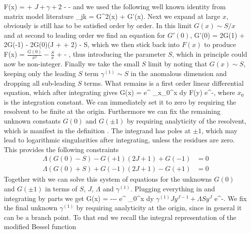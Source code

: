 \beq
	F(x) =  + \( J + \gamma + 2 \) -  - 
\eeq
and we used the following well known identity from matrix model literature
\beq
	\sum_{j\neq k}  = G^2(x) + G'(x).
\eeq
Next we expand  at large $x$, obviously is still has to be satisfied order by order.
In this limit $G(x) \sim S/x$ and at second to leading order we find an equation for $G'(0)$,
\beq
	\Lambda G'(0) = 2G(1) + 2G(-1) - 2G(0)(J + \gamma + 2) - \Lambda S,
\eeq
which we then stick back into $F(x)$ to produce
\beq
	F(x) = \( \frac{G(0)}{x^2} - \frac{S}{x} \) +  - ,
\eeq
thus introducing the parameter $S$, which in principle could now be non-integer.
Finally we take the small $S$ limit by noting that $G(x) \sim S$, keeping only the leading $S$ term $\gamma^{(1)} \sim S$ in the anomalous dimension and dropping all sub-leading $S$ terms. 
What remains is a first order linear differential equation, which after integrating gives
\beq
	G(x) =  e^{\Lambda {}} \int_{x_0}^x dy \; F(y)  e^{-\Lambda {}},
\eeq
where $x_0$ is the integration constant.
We can immediately set it to zero by requiring the resolvent to be finite at the origin.
Furthermore we can fix the remaining unknown constants $G(0)$ and $G(\pm 1)$ by requiring analyticity of the resolvent, which is manifest in the definition .
The integrand has poles at $\pm 1$, which may lead to logarithmic singularities after integrating, unless the residues are zero.
This provides the following constraints
\begin{subequations}
  \begin{align}
	\Lambda(G(0)-S) - G(+1)(2J+1)+G(-1) &= 0 \\
	\Lambda(G(0)+S) + G(-1)(2J+1)-G(+1) &= 0
  \end{align}
\end{subequations}
Together with  we can solve this system of equations for the unknowns $G(0)$ and $G(\pm 1)$ in terms of $S$, $J$, $\Lambda$ and $\gamma^{(1)}$.
Plugging everything in and integrating by parts we get
\beq
\label{eq:Gfinal}
G(x) = ---  e^{\Lambda {}} \int_0^x dy \( \gamma^{(1)} J y^{J-1} + \Lambda S y^J \) e^{-\Lambda {}}.
\eeq
We fix the final unknown $\gamma^{(1)}$ by requiring analyticity at the origin, since in general it can be a branch point. To that end we recall the integral representation of the modified Bessel function
